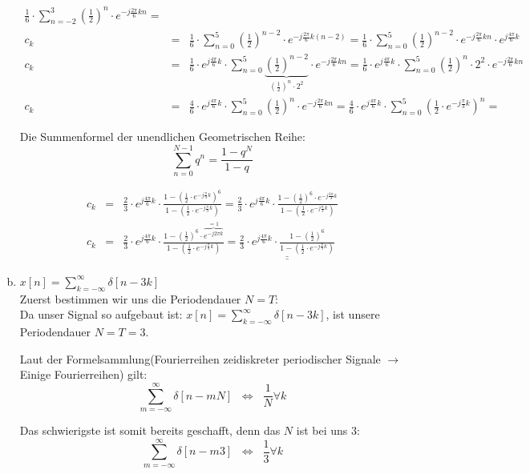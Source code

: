 \begin{uebsp}
\begin{Answer}
\begin{enumerate}[a)]
\begin{eqnarray*}
            \frac{1}{6}\cdot\sum_{n=-2}^{3}\left(\frac{1}{2}\right)^n\cdot e^{-j\frac{2\pi}{6}kn}=\\
            c_k&=&\frac{1}{6}\cdot\sum_{n=0}^{5}\left(\frac{1}{2}\right)^{n-2}\cdot e^{-j\frac{2\pi}{6}k(n-2)}=
            \frac{1}{6}\cdot\sum_{n=0}^{5}\left(\frac{1}{2}\right)^{n-2}\cdot e^{-j\frac{2\pi}{6}kn}\cdot e^{j\frac{4\pi}{6}k}\\
            c_k&=&\frac{1}{6}\cdot e^{j\frac{4\pi}{6}k}\cdot\sum_{n=0}^{5}\underbrace{\left(\frac{1}{2}\right)^{n-2}}_{\left(\frac{1}{2}\right)^n\cdot 2^2}\cdot e^{-j\frac{2\pi}{6}kn}=
            \frac{1}{6}\cdot e^{j\frac{4\pi}{6}k}\cdot\sum_{n=0}^{5}{\left(\frac{1}{2}\right)^n\cdot 2^2}\cdot e^{-j\frac{2\pi}{6}kn}\\
            c_k&=&\frac{4}{6}\cdot e^{j\frac{4\pi}{6}k}\cdot\sum_{n=0}^{5}{\left(\frac{1}{2}\right)^n}\cdot e^{-j\frac{2\pi}{6}kn}=\frac{4}{6}\cdot e^{j\frac{4\pi}{6}k}\cdot\sum_{n=0}^{5}\left(\frac{1}{2}\cdot e^{-j\frac{\pi}{3}k}\right)^n=
        \end{eqnarray*}
        \begin{uebsp_theory}
            Die Summenformel der unendlichen Geometrischen Reihe:
            \[\sum_{n=0}^{N-1}q^n=\frac{1-q^N}{1-q}\]
        \end{uebsp_theory}
        \begin{eqnarray*}
            c_k&=&\frac{2}{3}\cdot e^{j\frac{4\pi}{6}k}\cdot\frac{1-\left(\frac{1}{2}\cdot e^{-j\frac{\pi}{3}k}\right)^6}{1-\left(\frac{1}{2}\cdot e^{-j\frac{\pi}{3}k}\right)}=
            \frac{2}{3}\cdot e^{j\frac{4\pi}{6}k}\cdot\frac{1-\left(\frac{1}{2}\right)^6\cdot e^{-j\frac{6\pi}{3}k}}{1-\left(\frac{1}{2}\cdot e^{-j\frac{\pi}{3}k}\right)}\\
    c_k&=&\frac{2}{3}\cdot e^{j\frac{4\pi}{6}k}\cdot\frac{1-\left(\frac{1}{2}\right)^6\cdot \overbrace{e^{-j2\pi k}}^{=1}}{1-\left(\frac{1}{2}\cdot e^{-j\frac{\pi}{3}k}\right)}=
            \underline{\underline{\frac{2}{3}\cdot e^{j\frac{4\pi}{6}k}\cdot\frac{1-\left(\frac{1}{2}\right)^6}{1-\left(\frac{1}{2}\cdot e^{-j\frac{\pi}{3}k}\right)}}}
        \end{eqnarray*}
    \item $x[n]=\sum_{k=-\infty}^\infty\delta[n-3k]$\\
        Zuerst bestimmen wir uns die Periodendauer $N=T$:\\
        Da unser Signal so aufgebaut ist: $x[n]=\sum_{k=-\infty}^\infty\delta[n-3k]$, ist unsere Periodendauer $N=T=3$.
        \begin{uebsp_theory}
        Laut der Formelsammlung(Fourierreihen zeidiskreter periodischer Signale $\rightarrow$ Einige Fourierreihen) gilt:
        \[\sum_{m=-\infty}^\infty\delta[n-mN]\;\;\Leftrightarrow\;\;\frac{1}{N}\forall k\]
        \end{uebsp_theory}
        Das schwierigste ist somit bereits geschafft, denn das $N$ ist bei uns $3$:
        \[\sum_{m=-\infty}^\infty\delta[n-m3]\;\;\Leftrightarrow\;\;\frac{1}{3}\forall k\]
\end{enumerate}
\end{Answer}
\end{uebsp}
